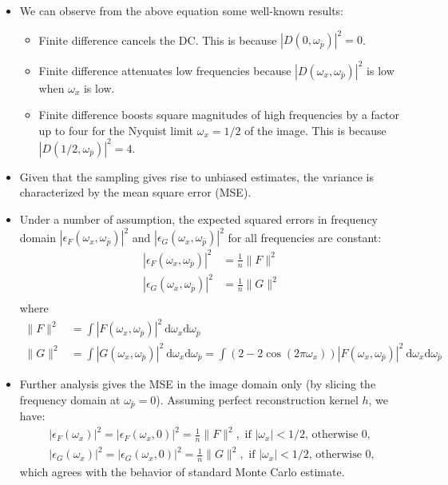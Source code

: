 \documentclass[10pt]{article}
\newcommand{\dee}{\mathrm{d}}
\begin{document}
\begin{itemize}
  	\item We can observe from the above equation some well-known results:
  	\begin{itemize}
  		\item Finite difference cancels the DC.  This is because $|D(0, \omega_{\bar p})|^2 = 0$.
  		\item Finite difference attenuates low frequencies because $|D(\omega_x, \omega_{\bar p})|^2$ is low when $\omega_x$ is low.
  		\item Finite difference boosts square magnitudes of high frequencies by a factor up to four for the Nyquist limit $\omega_x = 1/2$ of the image.  This is because $|D(1/2, \omega_{\bar p})|^2 = 4$.
  	\end{itemize}

  	\item Given that the sampling gives rise to unbiased estimates, the variance is characterized by the mean square error (MSE).

  	\item Under a number of assumption, the expected squared errors in frequency domain $|\epsilon_F(\omega_x, \omega_{\bar p})|^2$ and $|\epsilon_G(\omega_x, \omega_{\bar p})|^2$ for all frequencies are constant:
  	\begin{align*}
  		|\epsilon_F(\omega_x, \omega_{\bar p})|^2 &= \frac{1}{n} \| F \|^2 \\
  		|\epsilon_G(\omega_x, \omega_{\bar p})|^2 &= \frac{1}{n} \| G \|^2 \\
  	\end{align*}
  	where
  	\begin{align*}
  		\| F \|^2 &= \int  |F(\omega_x, \omega_{\bar p})|^2\ \dee\omega_x \dee\omega_{\bar p} \\
  		\| G \|^2 &= \int  |G(\omega_x, \omega_{\bar p})|^2\ \dee\omega_x \dee\omega_{\bar p} 
  		= \int  (2 - 2\cos(2\pi\omega_x))|F(\omega_x, \omega_{\bar p})|^2\ \dee\omega_x \dee\omega_{\bar p} 
  	\end{align*}

  	\item Further analysis gives the MSE in the image domain only (by slicing the frequency domain at $\omega_{\bar p} = 0$).  Assuming perfect reconstruction kernel $h$, we have:
  	\begin{align*}
  		|\epsilon_F(\omega_x)|^2 = |\epsilon_F(\omega_x,0)|^2 = \frac{1}{n} \| F \|^2,\mbox{ if $|\omega_x| < 1/2$, otherwise 0,} \\
  		|\epsilon_G(\omega_x)|^2 = |\epsilon_G(\omega_x,0)|^2 = \frac{1}{n} \| G \|^2,\mbox{ if $|\omega_x| < 1/2$, otherwise 0,}
  	\end{align*}
  	which agrees with the behavior of standard Monte Carlo estimate.  	
  \end{itemize}
\end{document}
